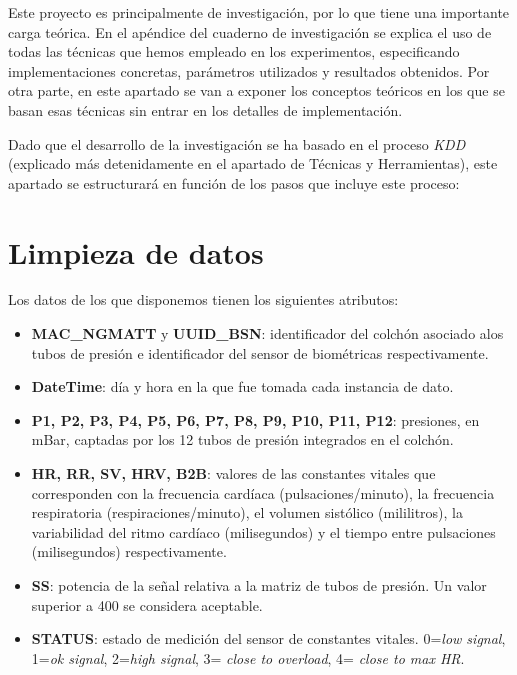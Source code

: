 
Este proyecto es principalmente de investigación, por lo que tiene una importante carga teórica. En el apéndice del cuaderno de investigación se explica el uso de todas las técnicas que hemos empleado en los experimentos, especificando implementaciones concretas, parámetros utilizados y resultados obtenidos. Por otra parte, en este apartado se van a exponer los conceptos teóricos en los que se basan esas técnicas sin entrar en los detalles de implementación.  

Dado que el desarrollo de la investigación se ha basado en el proceso \textit{KDD} (explicado más detenidamente en el apartado de Técnicas y Herramientas), este apartado se estructurará en función de los pasos que incluye este proceso: 

\section{Limpieza de datos}

Los datos de los que disponemos tienen los siguientes atributos: 

\begin{itemize}
	\item \textbf{MAC\_NGMATT} y \textbf{UUID\_BSN}: identificador del colchón asociado alos tubos de presión e identificador del sensor de biométricas respectivamente. 
	\item \textbf{DateTime}: día y hora en la que fue tomada cada instancia de dato. 
	\item \textbf{P1, P2, P3, P4, P5, P6, P7, P8, P9, P10, P11, P12}: presiones, en mBar, captadas por los 12 tubos de presión integrados en el colchón. 
	\item \textbf{HR, RR, SV, HRV, B2B}: valores de las constantes vitales que corresponden con la frecuencia cardíaca (pulsaciones/minuto), la frecuencia respiratoria (respiraciones/minuto), el volumen sistólico (mililitros), la variabilidad del ritmo cardíaco (milisegundos) y el tiempo entre pulsaciones (milisegundos) respectivamente. 
	\item \textbf{SS}: potencia de la señal relativa a la matriz de tubos de presión. Un valor superior a 400 se considera aceptable. 
	\item \textbf{STATUS}: estado de medición del sensor de constantes vitales. 0=\textit{low signal}, 1=\textit{ok signal}, 2=\textit{high signal}, 3= \textit{close to overload}, 4= \textit{close to max HR}. 
\end{itemize}

